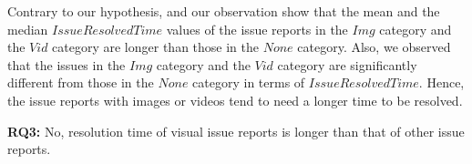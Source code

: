 Contrary to our hypothesis,  and our observation show that 
the mean and the median $IssueResolvedTime$ values of 
the issue reports in the $Img$ category and the $Vid$ category are 
longer than those in the $None$ category. 
Also, we observed that the issues in the $Img$ category and 
the $Vid$ category are significantly different from those 
in the $None$ category in terms of $IssueResolvedTime$.
Hence, the issue reports with images or videos tend to need 
a longer time to be resolved. 




\summarybox
{{\bf RQ3: }{No, resolution time of visual issue reports is longer than that of other issue reports.
}}




